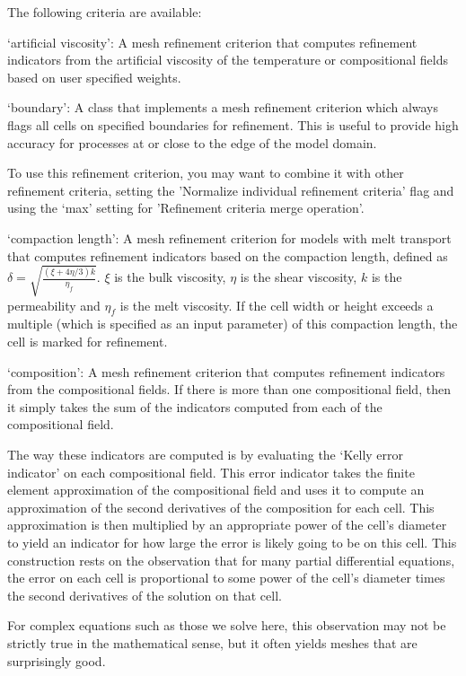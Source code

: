 \begin{itemize}
The following criteria are available:

`artificial viscosity': A mesh refinement criterion that computes refinement indicators from the artificial viscosity of the temperature or compositional fields based on user specified weights.

`boundary': A class that implements a mesh refinement criterion which always flags all cells on specified boundaries for refinement. This is useful to provide high accuracy for processes at or close to the edge of the model domain.

To use this refinement criterion, you may want to combine it with other refinement criteria, setting the 'Normalize individual refinement criteria' flag and using the `max' setting for 'Refinement criteria merge operation'.

`compaction length': A mesh refinement criterion for models with melt transport that computes refinement indicators based on the compaction length, defined as $\delta = \sqrt{\frac{(\xi + 4 \eta/3) k}{\eta_f}}$. $\xi$ is the bulk viscosity, $\eta$ is the shear viscosity, $k$ is the permeability and $\eta_f$ is the melt viscosity. If the cell width or height exceeds a multiple (which is specified as an input parameter) of this compaction length, the cell is marked for refinement.

`composition': A mesh refinement criterion that computes refinement indicators from the compositional fields. If there is more than one compositional field, then it simply takes the sum of the indicators computed from each of the compositional field.

The way these indicators are computed is by evaluating the `Kelly error indicator' on each compositional field. This error indicator takes the finite element approximation of the compositional field and uses it to compute an approximation of the second derivatives of the composition for each cell. This approximation is then multiplied by an appropriate power of the cell's diameter to yield an indicator for how large the error is likely going to be on this cell. This construction rests on the observation that for many partial differential equations, the error on each cell is proportional to some power of the cell's diameter times the second derivatives of the solution on that cell.

For complex equations such as those we solve here, this observation may not be strictly true in the mathematical sense, but it often yields meshes that are surprisingly good.


\end{itemize}
